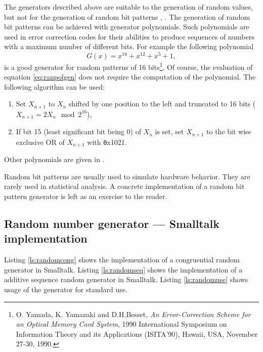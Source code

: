  The generators described above
are suitable to the generation of random values, but not for the
generation of random bit patterns \cite{Knuth2}, \cite{Press}. The
generation of random bit patterns can be achieved with generator
polynomials. Such polynomials are used in error correction codes
for their abilities to produce sequences of numbers with a maximum
number of different bits. For example the following polynomial
\begin{equation}
\label{eq:ranpolgen}
  G\left(x\right) = x^{16} + x^{12} +x^5 + 1,
\end{equation}
is a good generator for random patterns of 16 bits\footnote{\cf O.
Yamada, K. Yamazaki and D.H.Besset, {\em An Error-Correction
Scheme for an Optical Memory Card System}, 1990 International
Symposium on Information Theory and its Applications (ISITA'90),
Hawaii, USA, November 27-30, 1990.}. Of course, the evaluation of
equation \ref{eq:ranpolgen} does not require the computation of
the polynomial. The following algorithm can be used: {\parskip 0pt
\begin{enumerate}
  \item Set $X_{n+1}$ to $X_n$ shifted by one position to the left
  and truncated to 16 bits ($X_{n+1}=2X_n \mod 2^{16}$),
  \item If bit 15 (least significant bit being 0) of $X_n$ is set,
  set $X_{n+1}$ to the bit wise exclusive OR of $X_{n+1}$ with
  {\texttt 0x1021}.
\end{enumerate}}
\noindent Other polynomials are given in \cite{Press}.

Random bit patterns are usually used to simulate hardware
behavior. They are rarely used in statistical analysis. A concrete
implementation of a random bit pattern generator is left as an
exercise to the reader.

\subsection{Random number generator --- Smalltalk implementation}
 Listing \ref{ls:randomcong} shows
the implementation of a congruential random generator in
Smalltalk. Listing \ref{ls:randomseq} shows the implementation of
a additive sequence random generator in Smalltalk. Listing
\ref{ls:randomuse} shows usage of the generator for standard use.

